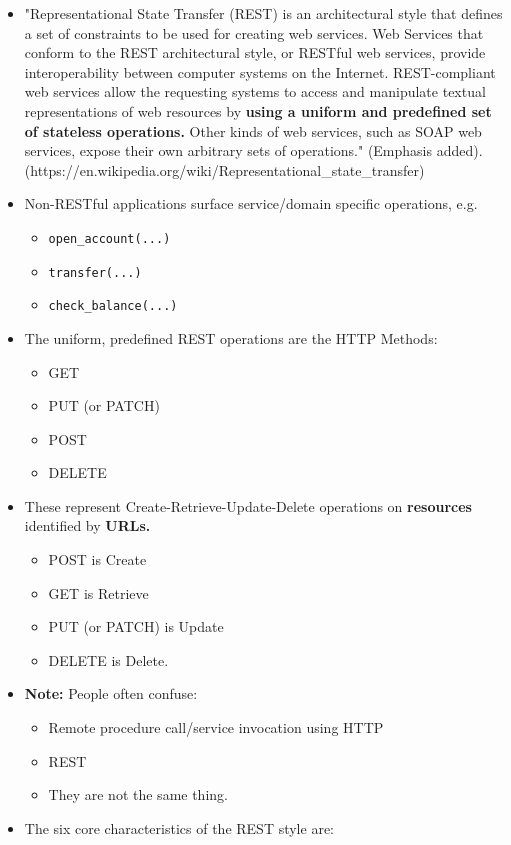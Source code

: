 \documentclass[11pt]{article}
\providecommand{\tightlist}{%
      \setlength{\itemsep}{0pt}\setlength{\parskip}{0pt}}
\begin{document}
\begin{itemize}
\item
  "Representational State Transfer (REST) is an architectural style that
  defines a set of constraints to be used for creating web services. Web
  Services that conform to the REST architectural style, or RESTful web
  services, provide interoperability between computer systems on the
  Internet. REST-compliant web services allow the requesting systems to
  access and manipulate textual representations of web resources by
  \textbf{using a uniform and predefined set of stateless operations.}
  Other kinds of web services, such as SOAP web services, expose their
  own arbitrary sets of operations." (Emphasis
  added).(https://en.wikipedia.org/wiki/Representational\_state\_transfer)
\item
  Non-RESTful applications surface service/domain specific operations,
  e.g.

  \begin{itemize}
  \tightlist
  \item
    \texttt{open\_account(...)}
  \item
    \texttt{transfer(...)}
  \item
    \texttt{check\_balance(...)}
  \end{itemize}
\item
  The uniform, predefined REST operations are the HTTP Methods:

  \begin{itemize}
  \tightlist
  \item
    GET
  \item
    PUT (or PATCH)
  \item
    POST
  \item
    DELETE
  \end{itemize}
\item
  These represent Create-Retrieve-Update-Delete operations on
  \textbf{resources} identified by \textbf{URLs.}

  \begin{itemize}
  \tightlist
  \item
    POST is Create
  \item
    GET is Retrieve
  \item
    PUT (or PATCH) is Update
  \item
    DELETE is Delete.
  \end{itemize}
\item
  \textbf{Note:} People often confuse:

  \begin{itemize}
  \tightlist
  \item
    Remote procedure call/service invocation using HTTP
  \item
    REST
  \item
    They are not the same thing.
  \end{itemize}
\item
  The six core characteristics of the REST style are:


\end{itemize}
\end{document}
